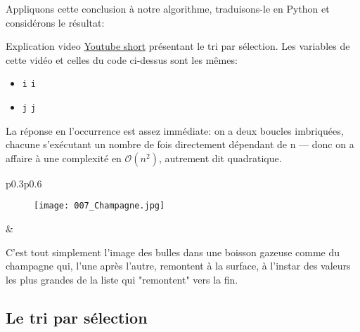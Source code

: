 \documentclass[12pt]{article}
\begin{document}
	Appliquons cette conclusion à notre algorithme, traduisons-le en Python et considérons le résultat:
	
	\begin{MonAmp}{Explication video}
		\href{https://www.youtube.com/shorts/y2AghjB4Wxs?feature=share}{Youtube short} présentant le tri par sélection. Les variables de cette vidéo et celles du code ci-dessus sont les mêmes:
		\begin{itemize}
			\item \texttt{i} \quad \faExchange \quad \texttt{i}
			\item \texttt{j} \quad \faExchange \quad \texttt{j}
		\end{itemize}
	\end{MonAmp}
	
	
	\begin{MaReponse}
		La réponse en l'occurrence est assez immédiate: on a deux boucles imbriquées, chacune s'exécutant un nombre de fois directement dépendant de n --- donc on a affaire à une complexité en $\mathcal{O}(n^2)$, autrement dit quadratique.
	\end{MaReponse}
	
	
	\begin{MaReponse}
		\begin{tabular}{p{0.3\textwidth}p{0.6\textwidth}}
			\begin{minipage}{\linewidth}
				\begin{figure}[H]
					\centering
					\texttt{[image: 007\_Champagne.jpg]}
				\end{figure}
			\end{minipage}
			&
			\begin{minipage}{\linewidth}
				C'est tout simplement l'image des bulles dans une boisson gazeuse comme du champagne qui, l'une après l'autre, remontent à la surface, à l'instar des valeurs les plus grandes de la liste qui "remontent" vers la fin.
			\end{minipage}
		\end{tabular}			
	\end{MaReponse}
		
	\subsection{Le tri par sélection}
\end{document}
